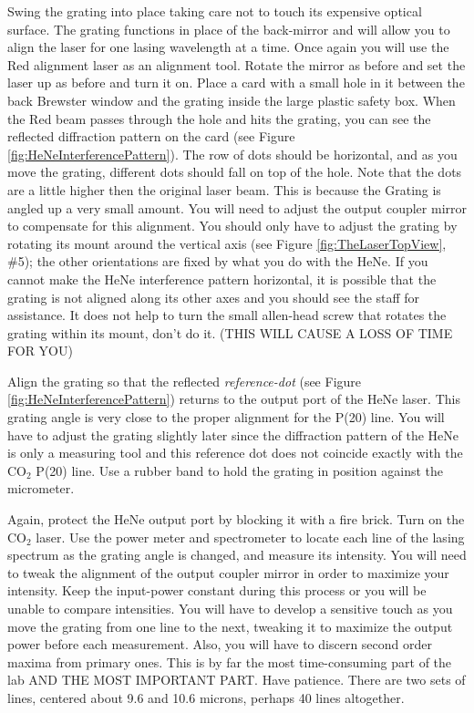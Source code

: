 \documentclass{../lab}
\begin{document}
\begin{enumerate}
    Swing the grating into place taking care not to touch its expensive optical surface. The grating functions in place of the back-mirror and will allow you to align the laser for one lasing wavelength at a time. Once again you will use the Red alignment laser as an alignment tool. Rotate the mirror as before and set the laser up as before and turn it on. Place a card with a small hole in it between the back Brewster window and the grating inside the large plastic safety box. When the Red beam passes through the hole and hits the grating, you can see the reflected diffraction pattern on the card (see Figure \ref{fig:HeNeInterferencePattern}). The row of dots should be horizontal, and as you move the grating, different dots should fall on top of the hole. Note that the dots are a little higher then the original laser beam. This is because the Grating is angled up a very small amount. You will need to adjust the output coupler mirror to compensate for this alignment. You should only have to adjust the grating by rotating its mount around the vertical axis (see Figure \ref{fig:TheLaserTopView}, \#5); the other orientations are fixed by what you do with the HeNe. If you cannot make the HeNe interference pattern horizontal, it is possible that the grating is not aligned along its other axes and you should see the staff for assistance. It does not help to turn the small allen-head screw that rotates the grating within its mount, don't do it. (THIS WILL CAUSE A LOSS OF TIME FOR YOU)
    
    Align the grating so that the reflected \emph{reference-dot} (see Figure \ref{fig:HeNeInterferencePattern}) returns to the output port of the HeNe laser. This grating angle is very close to the proper alignment for the P(20) line. You will have to adjust the grating slightly later since the diffraction pattern of the HeNe is only a measuring tool and this reference dot does not coincide exactly with the CO$_2$ P(20) line. Use a rubber band to hold the grating in position against the micrometer.
    
    
    
    Again, protect the HeNe output port by blocking it with a fire brick. Turn on the CO$_2$ laser. Use the power meter and spectrometer to locate each line of the lasing spectrum as the grating angle is changed, and measure its intensity. You will need to tweak the alignment of the output coupler mirror in order to maximize your intensity. Keep the input-power constant during this process or you will be unable to compare intensities. You will have to develop a sensitive touch as you move the grating from one line to the next, tweaking it to maximize the output power before each measurement. Also, you will have to discern second order maxima from primary ones. This is by far the most time-consuming part of the lab AND THE MOST IMPORTANT PART. Have patience. There are two sets of lines, centered about 9.6 and 10.6 microns, perhaps 40 lines altogether.
   

\end{enumerate}
\end{document}
